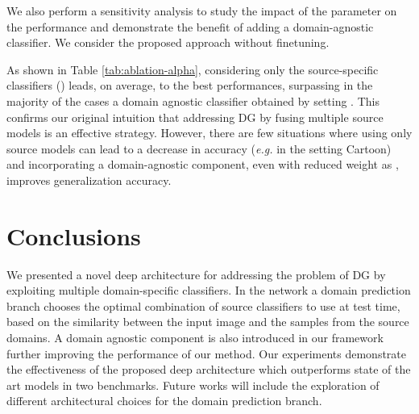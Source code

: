 \documentclass{article}
\begin{document}
We also perform a sensitivity analysis to study the impact of the parameter  on the performance and demonstrate the benefit of adding a domain-agnostic classifier. We consider the proposed approach without finetuning.
\begin{table}[t]
			\caption{PACS dataset: sensitivity analysis. } 
		\centering
		\label{tab:ablation-alpha}
    \vspace{-0.5cm}
\end{table}
As shown in Table \ref{tab:ablation-alpha}, considering only the source-specific classifiers () leads, on average, to the best performances, surpassing in the majority of the cases a domain agnostic classifier obtained by setting . This confirms our original intuition that addressing DG by fusing multiple source models is an effective strategy. However, there are few situations where using only source models can lead to a decrease in accuracy (\textit{e.g.} in the setting Cartoon) and incorporating a domain-agnostic component, even with reduced weight as , improves generalization accuracy.  



\vspace{-0.3cm}
\section{Conclusions}
\vspace{-0.3cm}
We presented a novel deep architecture for addressing the problem of DG by exploiting multiple domain-specific classifiers. In the network a domain prediction branch chooses the optimal combination of source classifiers to use at test time, based on the similarity between the input image and the samples from the source domains. A domain agnostic component is also introduced in our framework further improving the performance of our method. Our experiments demonstrate the effectiveness of the proposed deep architecture which outperforms state of the art models in two benchmarks. Future works will include the exploration of different architectural choices for the domain prediction branch.





\end{document}
